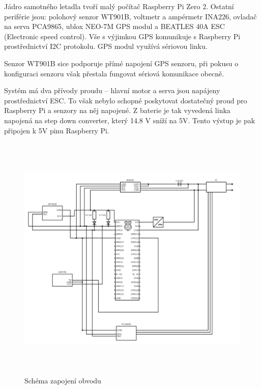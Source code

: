 \documentclass[a4paper,oneside,12pt]{report}
\begin{document}
Jádro samotného letadla tvoří malý počítač Raspberry Pi Zero 2.
Ostatní periférie jsou: polohový senzor WT901B, voltmetr a ampérmetr INA226, ovladač na serva PCA9865, ublox NEO-7M GPS modul a BEATLES 40A ESC (Electronic speed control).
Vše s výjimkou GPS komunikuje s Raspberry Pi prostřednictví I2C protokolu.
GPS modul využívá sériovou linku.

Senzor WT901B sice podporuje přímé napojení GPS senzoru, při pokusu o konfiguraci senzoru však přestala fungovat sériová komunikace obecně.

Systém má dva přívody proudu -- hlavní motor a serva jsou napájeny prostřednictví ESC.
To však nebylo schopné poskytovat dostatečný proud pro Raspberry Pi a senzory na něj napojené.
Z baterie je tak vyvedená linka napojená na step down converter, který 14.8 V sníží na 5V.
Tento výstup je pak připojen k 5V pinu Raspberry Pi.

\begin{figure}[h]
  \centering
  \includegraphics[height=12cm]{../img/schema.png}
  \caption[Schéma zapojení obvodu]{Schéma zapojení obvodu}
\end{figure}

\newpage
\end{document}
